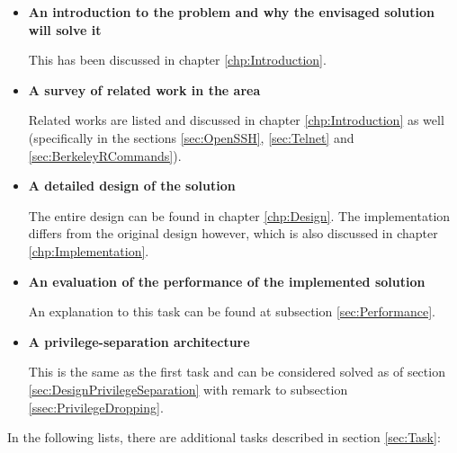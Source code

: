 \documentclass[10pt,a4paper,titlepage,twoside,english,final]{zhawreprt}
\begin{document}
\begin{itemize}
\item \textbf{An introduction to the problem and why the envisaged solution will solve it}

This has been discussed in chapter \ref{chp:Introduction}.

\item \textbf{A survey of related work in the area}

Related works are listed and discussed in chapter \ref{chp:Introduction} as well (specifically in the sections \ref{sec:OpenSSH}, \ref{sec:Telnet} and \ref{sec:BerkeleyRCommands}).

\item \textbf{A detailed design of the solution}

The entire design can be found in chapter \ref{chp:Design}.
The implementation differs from the original design however, which is also discussed in chapter \ref{chp:Implementation}.

\item \textbf{An evaluation of the performance of the implemented solution}

An explanation to this task can be found at subsection \ref{sec:Performance}.

\item \textbf{A privilege-separation architecture}

This is the same as the first task and can be considered solved as of section \ref{sec:DesignPrivilegeSeparation} with remark to subsection \ref{ssec:PrivilegeDropping}.
\end{itemize}

In the following lists, there are additional tasks described in section \ref{sec:Task}:
\end{document}
